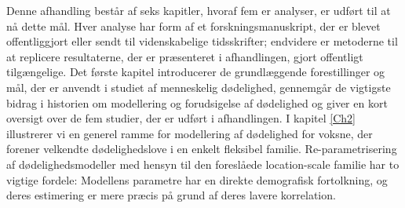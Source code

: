 \documentclass[Thesis]{subfiles}
\begin{document}
Denne afhandling best{\aa}r af seks kapitler, hvoraf fem er analyser, er udf{\o}rt til at n{\aa} dette m{\aa}l. Hver analyse har form af et forskningsmanuskript, der er blevet offentliggjort eller sendt til videnskabelige tidsskrifter; endvidere er metoderne til at replicere resultaterne, der er pr{\ae}senteret i afhandlingen, gjort offentligt tilg{\ae}ngelige. Det første kapitel introducerer de grundlæggende forestillinger og m{\aa}l, der er anvendt i studiet af menneskelig d{\o}delighed, gennemg{\aa}r de vigtigste bidrag i historien om modellering og forudsigelse af d{\o}delighed og giver en kort oversigt over de fem studier, der er udf{\o}rt i afhandlingen. I kapitel \ref{Ch2} illustrerer vi en generel ramme for modellering af d{\o}delighed for voksne, der forener velkendte d{\o}delighedslove i en enkelt fleksibel familie. Re-parametrisering af d{\o}delighedsmodeller med hensyn til den foresl{\aa}ede location-scale familie har to vigtige fordele: Modellens parametre har en direkte demografisk fortolkning, og deres estimering er mere pr{\ae}cis p{\aa} grund af deres lavere korrelation.
\end{document}
